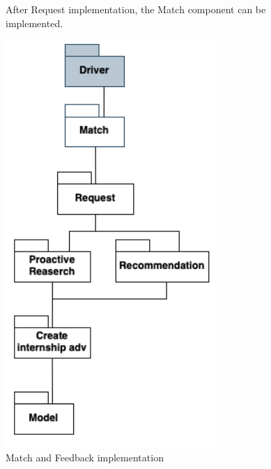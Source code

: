 \begin{figure}[H]
After Request implementation, the Match component can be implemented.\newline
    \begin{center}
        \includegraphics[width=8cm]{images/IntegrationStrategy/match.png}
        \caption{Match and Feedback implementation}
    \end{center}
\end{figure}

